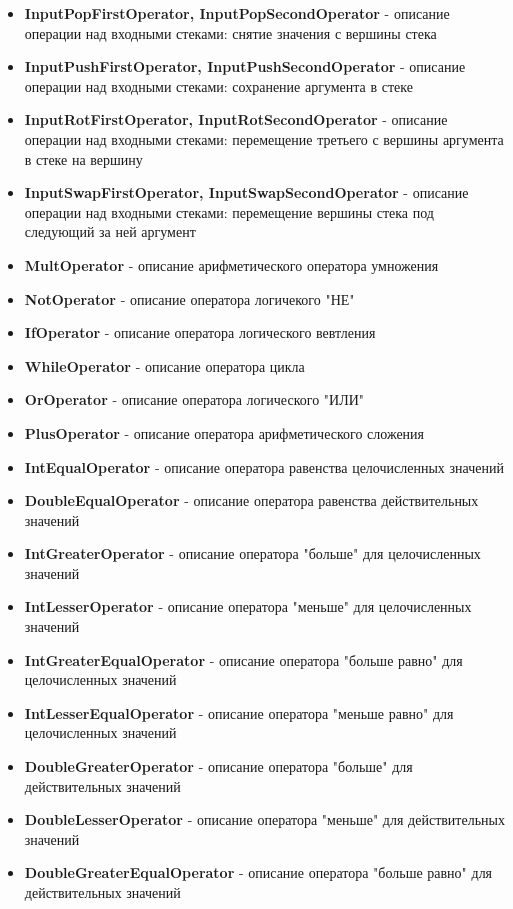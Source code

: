 \documentclass[russian,utf8,emptystyle]{eskdtext}
\begin{document}
\begin{itemize}
\item \textbf{InputPopFirstOperator, InputPopSecondOperator} - описание операции над входными стеками: снятие значения с вершины стека
\item \textbf{InputPushFirstOperator, InputPushSecondOperator} - описание операции над входными стеками: сохранение аргумента в стеке
\item \textbf{InputRotFirstOperator, InputRotSecondOperator} -  описание операции над входными стеками: перемещение третьего с вершины аргумента в стеке на вершину
\item \textbf{InputSwapFirstOperator, InputSwapSecondOperator} - описание операции над входными стеками: перемещение вершины стека под следующий за ней аргумент
\item \textbf{MultOperator} - описание арифметического оператора умножения
\item \textbf{NotOperator} -  описание оператора логичекого "НЕ"
\item \textbf{IfOperator} - описание оператора логического вевтления
\item \textbf{WhileOperator} - описание оператора цикла
\item \textbf{OrOperator} - описание оператора логического "ИЛИ"
\item \textbf{PlusOperator} - описание оператора арифметического сложения
\item \textbf{IntEqualOperator} - описание оператора равенства целочисленных значений
\item \textbf{DoubleEqualOperator} - описание оператора равенства действительных значений
\item \textbf{IntGreaterOperator} - описание оператора "больше" для целочисленных значений
\item \textbf{IntLesserOperator} - описание оператора "меньше" для целочисленных значений
\item \textbf{IntGreaterEqualOperator} - описание оператора "больше равно" для целочисленных значений
\item \textbf{IntLesserEqualOperator} - описание оператора "меньше равно" для целочисленных значений
\item \textbf{DoubleGreaterOperator} - описание оператора "больше" для действительных значений
\item \textbf{DoubleLesserOperator} - описание оператора "меньше" для действительных значений
\item \textbf{DoubleGreaterEqualOperator} - описание оператора "больше равно" для действительных значений

\end{itemize}
\end{document}
